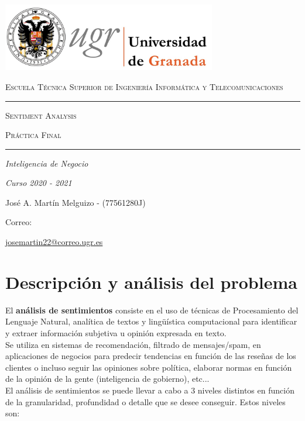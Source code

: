 \documentclass[a4paper,12pt]{report}
\begin{document}
\begin{titlepage}
    \centering
    {\includegraphics[width=0.7\textwidth]{images/ugr.jpeg}\par}
    \vspace{1cm}
    {\scshape\Large Escuela Técnica Superior de Ingeniería Informática y Telecomunicaciones \par}
    \vspace{2.5cm}
    \hrule height 0.5pt
    \vspace{0.5cm}
    {\scshape\Huge Sentiment Analysis \par}
    \vspace{1cm}
    {\scshape\large Práctica Final \par}
    \vspace{0.5cm}
    \hrule height 0.5pt
    \vspace{4cm}
    {\itshape\Large Inteligencia de Negocio \par}
    \vspace{0.2cm}
    {\itshape\Large Curso 2020 - 2021 \par}
    \vfill
    {\Large José A. Martín Melguizo - (77561280J) \par}
    \vspace{0.5cm}
    {\large Correo:} {\href{correo}{josemartin22@correo.ugr.es} \par}
    \vfill
    
\end{titlepage}


\clearpage
\tableofcontents
\clearpage

\chapter{Descripción y análisis del problema}

El \textbf{análisis de sentimientos} consiste en el uso de técnicas de Procesamiento del Lenguaje Natural, analítica de textos y lingüística computacional para identificar y extraer información subjetiva u opinión expresada en texto. 
\vspace{2mm}\\
Se utiliza en sistemas de recomendación, filtrado de mensajes/spam, en aplicaciones de negocios para predecir tendencias en función de las reseñas de los clientes o incluso seguir las opiniones sobre política, elaborar normas en función de la opinión de la gente (inteligencia de gobierno), etc...
\vspace{2mm}\\
El análisis de sentimientos se puede llevar a cabo a 3 niveles distintos en función de la granularidad, profundidad o detalle que se desee conseguir. Estos niveles son:
\end{document}
